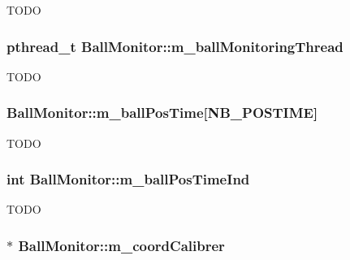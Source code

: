 \label{classBallMonitor_a5a9a84961419fefc7131d449bab07b0f}
TODO \hypertarget{classBallMonitor_a97247e5882aa1012dca3a84ba1350ffe}{
\subsubsection[{m\_\-ballMonitoringThread}]{\setlength{\rightskip}{0pt plus 5cm}pthread\_\-t {\bf BallMonitor::m\_\-ballMonitoringThread}}}
\label{classBallMonitor_a97247e5882aa1012dca3a84ba1350ffe}
TODO \hypertarget{classBallMonitor_ad20f7e0f913357a70ad2d5113bb7cb5b}{
\subsubsection[{m\_\-ballPosTime}]{ {\bf BallMonitor::m\_\-ballPosTime}\mbox{[}{\bf NB\_\-POSTIME}\mbox{]}}}
\label{classBallMonitor_ad20f7e0f913357a70ad2d5113bb7cb5b}
TODO \hypertarget{classBallMonitor_a2f93064edafac9ef59555ecc8d860e0f}{
\subsubsection[{m\_\-ballPosTimeInd}]{\setlength{\rightskip}{0pt plus 5cm}int {\bf BallMonitor::m\_\-ballPosTimeInd}}}
\label{classBallMonitor_a2f93064edafac9ef59555ecc8d860e0f}
TODO \hypertarget{classBallMonitor_addde606e4f6cd92dc43efd3342ce5f60}{
\subsubsection[{m\_\-coordCalibrer}]{$\ast$ {\bf BallMonitor::m\_\-coordCalibrer}}}
